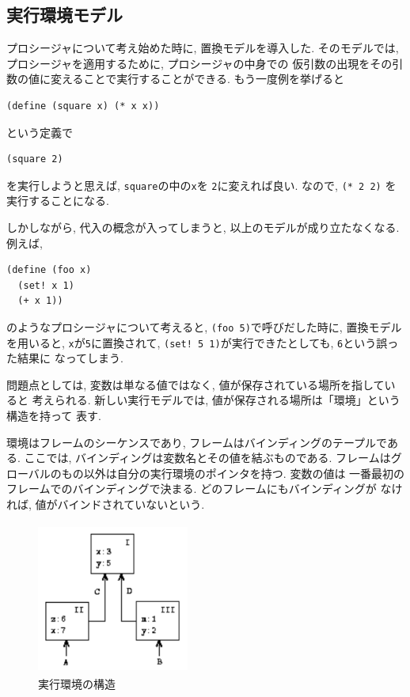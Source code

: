\setcounter{section}{3}
\setcounter{subsection}{1}
\subsection{実行環境モデル}
プロシージャについて考え始めた時に, 置換モデルを導入した.
そのモデルでは, プロシージャを適用するために, プロシージャの中身での
仮引数の出現をその引数の値に変えることで実行することができる.
もう一度例を挙げると

\begin{lstlisting}[basicstyle=\footnotesize]
(define (square x) (* x x))
\end{lstlisting}
\noindent
という定義で

\begin{lstlisting}[basicstyle=\footnotesize]
(square 2)
\end{lstlisting}
\noindent
を実行しようと思えば, \lstinline{square}の中の\lstinline{x}を
\lstinline{2}に変えれば良い. なので, \lstinline{(* 2 2)}
を実行することになる.

しかしながら, 代入の概念が入ってしまうと, 以上のモデルが成り立たなくなる.
例えば,

\begin{lstlisting}[basicstyle=\footnotesize]
(define (foo x)
  (set! x 1)
  (+ x 1))
\end{lstlisting}

のようなプロシージャについて考えると, \lstinline{(foo 5)}で呼びだした時に,
置換モデルを用いると, \lstinline{x}が\lstinline{5}に置換されて,
\lstinline{(set! 5 1)}が実行できたとしても, \lstinline{6}という誤った結果に
なってしまう.

問題点としては, 変数は単なる値ではなく, 値が保存されている場所を指していると
考えられる. 新しい実行モデルでは, 値が保存される場所は「環境」という構造を持って
表す.

環境はフレームのシーケンスであり, フレームはバインディングのテープルである.
ここでは, バインディングは変数名とその値を結ぶものである.
フレームはグローバルのもの以外は自分の実行環境のポインタを持つ. 変数の値は
一番最初のフレームでのバインディングで決まる. どのフレームにもバインディングが
なければ, 値がバインドされていないという.

\begin{figure}[ht]
  \centering
  \includegraphics[height=5cm,width=5cm]{imgs/environment_example.png}
  \caption{\label{fig:env-example}実行環境の構造}
\end{figure}


